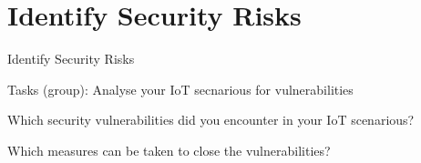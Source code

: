 ﻿\nopartpage
\part{Identify Security Risks}
\withpartpage

\begin{frame}{Identify Security Risks}
\begin{exampleblock}{Tasks (group): Analyse your IoT secnarious for vulnerabilities}
  \begin{description}[???]
    \item[???] Which security vulnerabilities did you encounter in your IoT scenarious?
    \item[???] Which measures can be taken to close the vulnerabilities?
  \end{description}
\end{exampleblock}
\end{frame}
